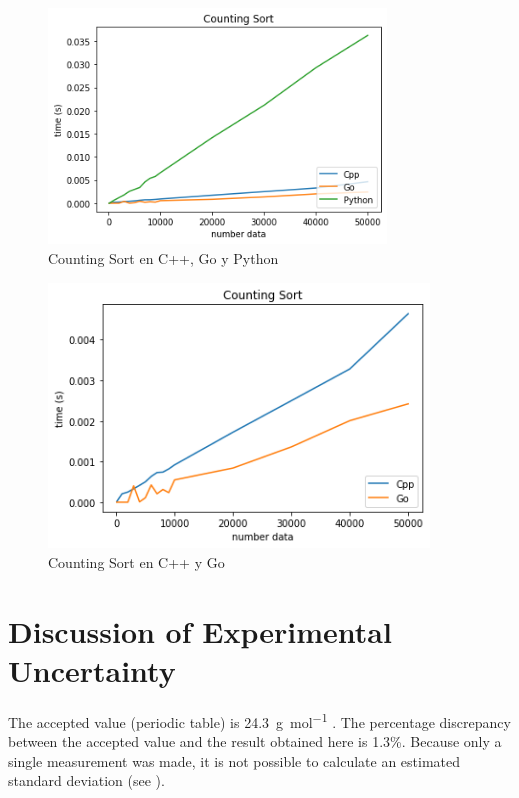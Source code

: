 \documentclass[https://www.overleaf.com/project/63761df255a8a9f4a15c3579
	letterpaper, %
	10pt, %
]{CSUniSchoolLabReport}
\begin{document}
\begin{figure}[H] 
	\centering 
	\includegraphics[width=0.8\textwidth]{Figures/countingSort.png} %
	\caption{Counting Sort en C++, Go y Python}
\end{figure}

\begin{figure}[H] 
	\centering 
	\includegraphics[width=0.9\textwidth]{Figures/countingSort2.png} %
	\caption{Counting Sort en C++ y Go}
\end{figure}


\section{Discussion of Experimental Uncertainty}

The accepted value (periodic table) is \SI{24.3}{\gram\per\mole} \autocite{Smith:2022qr}. The percentage discrepancy between the accepted value and the result obtained here is 1.3\%. Because only a single measurement was made, it is not possible to calculate an estimated standard deviation (see \textcite{Smith:2021jd}).
\end{document}
